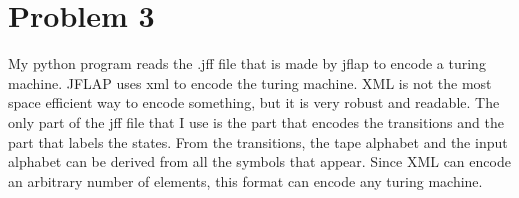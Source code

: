 \documentclass[12pt]{article}
\begin{document}
\section{Problem 3}

My python program reads the .jff file that is made by jflap to encode a turing machine. JFLAP uses xml to encode the turing machine. XML is not the most space efficient way to encode something, but it is very robust and readable. The only part of the jff file that I use is the part that encodes the transitions and the part that labels the states. From the transitions, the tape alphabet and the input alphabet can be derived from all the symbols that appear. Since XML can encode an arbitrary number of elements, this format can encode any turing machine.
\end{document}
